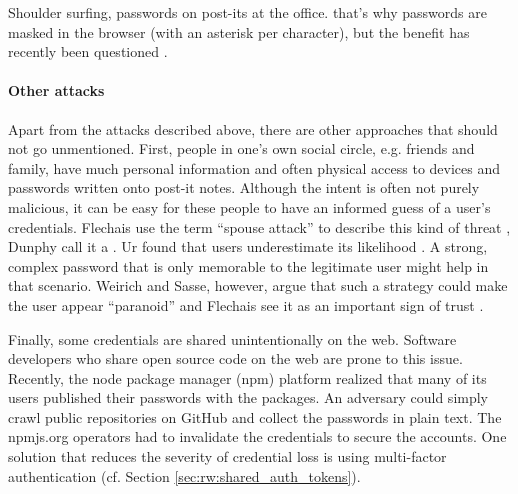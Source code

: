 Shoulder surfing, passwords on post-its at the office. that's why passwords are masked in the browser (with an asterisk per character), but the benefit has recently been questioned \cite{Sasse2016DebunkingMyths}. 



\paragraph{Other attacks} 
Apart from the attacks described above, there are other approaches that should not go unmentioned. First, people in one's own social circle, e.g. friends and family, have much personal information and often physical access to devices and passwords written onto post-it notes. Although the intent is often not purely malicious, it can be easy for these people to have an informed guess of a user's credentials. Flechais \etal use the term ``spouse attack'' to describe this kind of threat \cite{Flechais2013SaudiArabiaTrust}, Dunphy \etal call it a . Ur \etal found that users underestimate its likelihood \cite{Ur2016PerceptionsPassword}. A strong, complex password that is only memorable to the legitimate user might help in that scenario. Weirich and Sasse, however, argue that such a strategy could make the user appear ``paranoid'' \cite{Weirich2001PrettyGoodPersuasion} and Flechais \etal see it as an important sign of trust \cite{Flechais2005DivideConquerTrust, Flechais2013SaudiArabiaTrust}. 
 
Finally, some credentials are shared unintentionally on the web. Software developers who share open source code on the web are prone to this issue. Recently, the node package manager (npm) platform realized that many of its users published their passwords with the packages. An adversary could simply crawl public repositories on GitHub and collect the passwords in plain text. The npmjs.org operators had to invalidate the credentials to secure the accounts. One solution that reduces the severity of credential loss is using multi-factor authentication (cf. Section \ref{sec:rw:shared_auth_tokens}).





